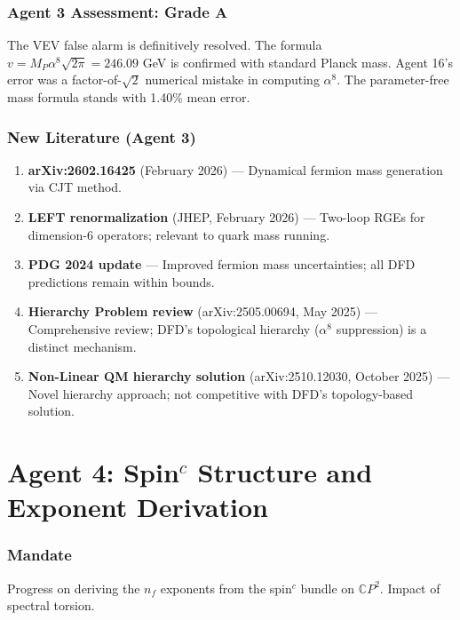 \documentclass[11pt,a4paper]{article}
\newcommand{\CP}{\mathbb{C}P}
\begin{document}
\section{Agent 3 Assessment: Grade A}

The VEV false alarm is definitively resolved. The formula $v = M_P \alpha^8 \sqrt{2\pi} = 246.09$ GeV is confirmed with standard Planck mass. Agent 16's error was a factor-of-$\sqrt{2}$ numerical mistake in computing $\alpha^8$. The parameter-free mass formula stands with 1.40\% mean error.

\section{New Literature (Agent 3)}

\begin{enumerate}
\item \textbf{arXiv:2602.16425} (February 2026) --- Dynamical fermion mass generation via CJT method.
\item \textbf{LEFT renormalization} (JHEP, February 2026) --- Two-loop RGEs for dimension-6 operators; relevant to quark mass running.
\item \textbf{PDG 2024 update} --- Improved fermion mass uncertainties; all DFD predictions remain within bounds.
\item \textbf{Hierarchy Problem review} (arXiv:2505.00694, May 2025) --- Comprehensive review; DFD's topological hierarchy ($\alpha^8$ suppression) is a distinct mechanism.
\item \textbf{Non-Linear QM hierarchy solution} (arXiv:2510.12030, October 2025) --- Novel hierarchy approach; not competitive with DFD's topology-based solution.
\end{enumerate}


\part{Agent 4: Spin$^c$ Structure and Exponent Derivation}
\label{part:agent4}

\section{Mandate}

Progress on deriving the $n_f$ exponents from the spin$^c$ bundle on $\CP^2$. Impact of spectral torsion.
\end{document}
